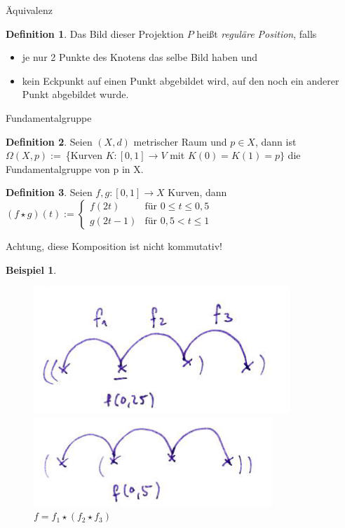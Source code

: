 \documentclass[a4paper,pagesizefontsize=12pt]{scrartcl}
\theoremstyle{definition}
\newtheorem{defi}{Definition}
\newtheorem*{bsp*}{Beispiel}
\theoremstyle{remark}
\begin{document}
\begin{section}{Äquivalenz}
\begin{defi}
Das Bild dieser Projektion $P$ heißt \textit{reguläre Position}, falls
\begin{itemize}
\item je nur 2 Punkte des Knotens das selbe Bild haben und
\item kein Eckpunkt auf einen Punkt abgebildet wird, auf den noch ein anderer Punkt abgebildet wurde.
\end{itemize}
\end{defi}
\end{section}

\begin{section}{Fundamentalgruppe}

\begin{defi}
Seien $(X,d)$ metrischer Raum und $p \in X$, dann ist\\ $\Omega(X,p) :=\ $\{Kurven $K:[0,1]\rightarrow V$ mit $K(0)=K(1)=p\}$ die Fundamentalgruppe von p in X.
\end{defi}

\begin{defi}
Seien $f,g : [0,1] \longrightarrow X$ Kurven, dann\\
$(f\star g)(t) :=
\begin{cases} 
f(2t) &\mbox{für } 0\leq t \leq 0,5\\
g(2t-1) & \mbox{für } 0,5 < t \leq 1
\end{cases} $
\end{defi}
\vspace{0.3cm}

Achtung, diese Komposition ist nicht kommutativ!
\begin{bsp*}
\ \\
\begin{figure}[H]
\center
\includegraphics[width=0.5\linewidth]{Komposition1}
\caption*{$f=(f_1 \star f_2)\star f_3$}
\includegraphics[width=0.5\linewidth]{Komposition2}
\caption*{$f=f_1 \star (f_2\star f_3)$}
\end{figure}
\end{bsp*}
\vspace{0.1cm}


\end{section}
\end{document}
